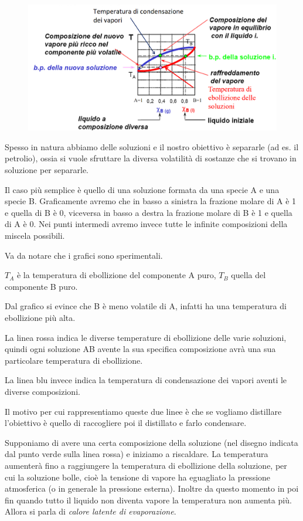 \begin{figure}[htp]
    \centering
    \includegraphics[width=15cm]{immagini/distillazione_ideale.png}
\end{figure}

Spesso in natura abbiamo delle soluzioni e il nostro obiettivo è separarle (ad es. il petrolio), ossia si vuole sfruttare la diversa volatilità di sostanze che si trovano in soluzione per separarle.

Il caso più semplice è quello di una soluzione formata da una specie A e una specie B. Graficamente avremo che in basso a sinistra la frazione molare di A è 1 e quella di B è 0, viceversa in basso a destra la frazione molare di B è 1 e quella di A è 0. Nei punti intermedi avremo invece tutte le infinite composizioni della miscela possibili.

Va da notare che i grafici sono sperimentali.

$T_A$ è la temperatura di ebollizione del componente A puro, $T_B$ quella del componente B puro.

Dal grafico si evince che B è meno volatile di A, infatti ha una temperatura di ebollizione più alta.

La linea rossa indica le diverse temperature di ebollizione delle varie soluzioni, quindi ogni soluzione AB avente la sua specifica composizione avrà una sua particolare temperatura di ebollizione.

La linea blu invece indica la temperatura di condensazione dei vapori aventi le diverse composizioni.

Il motivo per cui rappresentiamo queste due linee è che se vogliamo distillare l'obiettivo è quello di raccogliere poi il distillato e farlo condensare.

Supponiamo di avere una certa composizione della soluzione (nel disegno indicata dal punto verde sulla linea rossa) e iniziamo a riscaldare. La temperatura aumenterà fino a raggiungere la temperatura di ebollizione della soluzione, per cui la soluzione bolle, cioè la tensione di vapore ha eguagliato la pressione atmosferica (o in generale la pressione esterna). Inoltre da questo momento in poi fin quando  tutto il liquido non diventa vapore la temperatura non aumenta più. Allora si parla di \textit{calore latente di evaporazione}.

